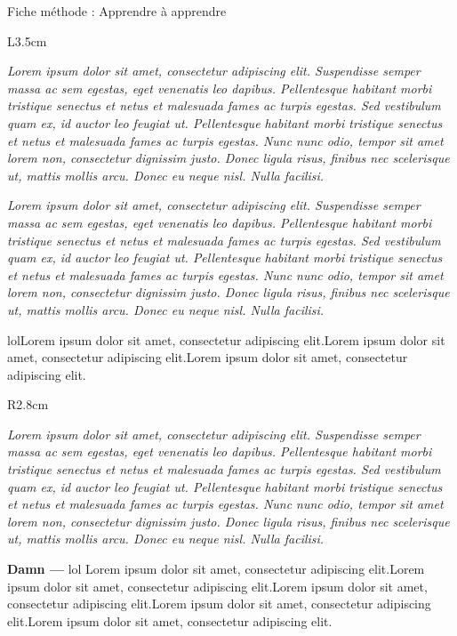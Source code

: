 \documentclass[10pt]{article}
\newcommand{\titre}{Fiche méthode : Apprendre à apprendre} %
\newcommand{\introduction}{
    Lorem ipsum dolor sit amet, consectetur adipiscing elit. Suspendisse semper massa ac sem egestas, eget venenatis leo dapibus. Pellentesque habitant morbi tristique senectus et netus et malesuada fames ac turpis egestas. Sed vestibulum quam ex, id auctor leo feugiat ut. Pellentesque habitant morbi tristique senectus et netus et malesuada fames ac turpis egestas. Nunc nunc odio, tempor sit amet lorem non, consectetur dignissim justo. Donec ligula risus, finibus nec scelerisque ut, mattis mollis arcu. Donec eu neque nisl. Nulla facilisi.
    }
\begin{document}
\thispagestyle{fancy}
\cfoot{}

\begin{titlebox}{\titre}
    \begin{wrapfigure}[]{L}{3.5cm}
        \vspace*{-0.7cm}
    \end{wrapfigure}%
    \textit{\introduction}
    
    \tcblower
    
    \textit{\introduction}
    

    lolLorem ipsum dolor sit amet, consectetur adipiscing elit.Lorem ipsum dolor sit amet, consectetur adipiscing elit.Lorem ipsum dolor sit amet, consectetur adipiscing elit.


        \begin{wrapfigure}[]{R}{2.8cm}
            \vspace*{-0.75cm}
        \end{wrapfigure}%
        \textit{\introduction}
    \linebreak[4]

    
    \textbf{\color{DarkRed} Damn ---} lol Lorem ipsum dolor sit amet, consectetur adipiscing elit.Lorem ipsum dolor sit amet, consectetur adipiscing elit.Lorem ipsum dolor sit amet, consectetur adipiscing elit.Lorem ipsum dolor sit amet, consectetur adipiscing elit.Lorem ipsum dolor sit amet, consectetur adipiscing elit.

    


    
\end{titlebox}
\end{document}
